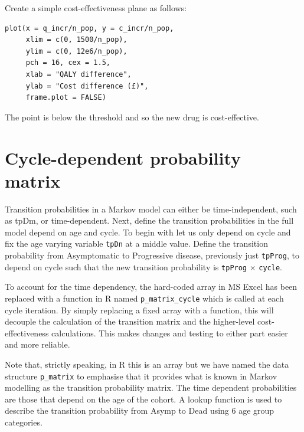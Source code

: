 \documentclass[a4paper,twoside,openany]{../svmonoBUGS}\usepackage[]{graphicx}\usepackage[]{color}
\begin{document}
Create a simple cost-effectiveness plane as follows:

\begin{verbatim}
plot(x = q_incr/n_pop, y = c_incr/n_pop,
     xlim = c(0, 1500/n_pop),
     ylim = c(0, 12e6/n_pop),
     pch = 16, cex = 1.5,
     xlab = "QALY difference",
     ylab = "Cost difference (£)",
     frame.plot = FALSE)
\end{verbatim}

The point is below the threshold and so the new drug is cost-effective.

%
\section{Cycle-dependent probability matrix}
Transition probabilities in a Markov model can either be time-independent, such as tpDm, or time-dependent.
Next, define the transition probabilities in the full model depend on age and cycle.
To begin with let us only depend on cycle and fix the age varying variable \texttt{tpDn} at a middle value.
Define the transition probability from Asymptomatic to Progressive disease, previously just \texttt{tpProg}, to depend on cycle such that the new transition probability is \texttt{tpProg} $\times$ \texttt{cycle}.

To account for the time dependency, the hard-coded array in MS Excel has been replaced with a function in R named \texttt{p\_matrix\_cycle} which is called at each cycle iteration. By simply replacing a fixed array with a function, this will decouple the calculation of the transition matrix and the higher-level cost-effectiveness calculations. This makes changes and testing to either part easier and more reliable.

Note that, strictly speaking, in R this is an array but we have named the data structure \texttt{p\_matrix} to emphasise that it provides what is known in Markov modelling as the transition probability matrix. The time dependent probabilities are those that depend on the age of the cohort. A lookup function is used to describe the transition probability from Asymp to Dead using 6 age group categories.
\end{document}
